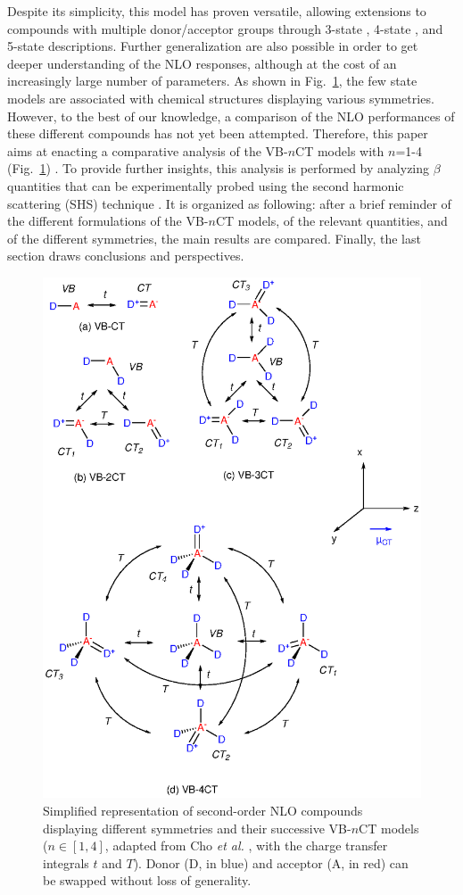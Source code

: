 \documentclass[USenglish]{article}
\begin{document}
Despite its simplicity, this model has proven versatile, allowing extensions to compounds with multiple donor/acceptor groups through 3-state \cite{hahnNonlinearOpticalProperties1999,barzoukasMolecularEngineeringPush2000,yangLargeOffDiagonalContribution2003}, 4-state \cite{choElementaryDescriptionNonlinear1998}, and 5-state \cite{choNonlinearOpticalProperties2002} descriptions. 
Further generalization are also possible \cite{alamGeneralizedFewstateModel2020} in order to get deeper understanding of the NLO responses, although at the cost of an increasingly large number of parameters.
As shown in Fig.~\ref{sc:mct}, the few state models are associated with chemical structures displaying various symmetries.
However, to the best of our knowledge, a comparison of the NLO performances of these different compounds has not yet been attempted. Therefore, this paper aims at enacting a comparative analysis of the  VB-$n$CT models with $n$=1-4  (Fig.~\ref{sc:mct}) .  To provide further insights, this analysis is performed  by analyzing $\beta$ quantities that can be experimentally probed using the second harmonic scattering (SHS) technique \cite{verbiestSecondOrderNonlinearOptical2009,baumeierDensityfunctionalBasedDetermination2010,zhangTheoreticalInvestigationFirst2013,sistoInitioNonadiabaticDynamics2014,dellaiDynamicEffectsNonlinear2024}.
It is organized as following: after a brief reminder of the different formulations of the VB-$n$CT models, of the relevant quantities, and of the different symmetries, the main results are compared. Finally, the last section draws conclusions and perspectives.

\begin{figure}
	\includegraphics[width=.7\linewidth]{Figure2}
	\caption{Simplified representation of second-order NLO compounds displaying different symmetries and their successive VB-$n$CT models ($n\in[1,4]$, adapted from Cho \textit{et al.} \cite{choNonlinearOpticalProperties2002}, with the charge transfer integrals $t$ and $T$). Donor (D, in blue) and acceptor (A, in red) can be swapped without loss of generality.}
	\label{sc:mct}
\end{figure}
\end{document}

